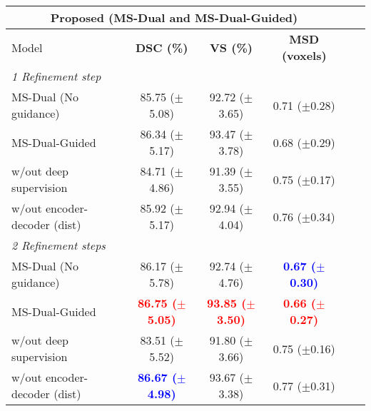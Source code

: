 \documentclass[journal]{IEEEtran}
\begin{document}
\begin{table}[ht!]
\centering
\scriptsize
\begin{tabular}{lcccc|c}\\
\toprule
\multicolumn{4}{c}{Proposed (MS-Dual and MS-Dual-Guided)} \\
\midrule
Model & \textbf{DSC (\%)} & \textbf{VS (\%)} & \textbf{MSD (voxels)}  \\
\midrule
\multicolumn{4}{l}{\textit{1 Refinement step}} \\
MS-Dual (No guidance)  & 85.75 ($\pm$5.08)& 92.72 ($\pm$3.65) & 0.71 ($\pm$0.28)\\
MS-Dual-Guided   & 86.34 ($\pm$5.17) & 93.47 ($\pm$3.78) & 0.68 ($\pm$0.29) \\
w/out deep supervision    & 84.71 ($\pm$4.86)  & 91.39 ($\pm$3.55) & 0.75 ($\pm$0.17) \\
w/out encoder-decoder (dist) &  85.92 ($\pm$5.17)  & 92.94 ($\pm$4.04) & 0.76 ($\pm$0.34)\\

\midrule
\multicolumn{4}{l}{\textit{2 Refinement steps}} \\
MS-Dual (No guidance)   & 86.17 ($\pm$5.78) & 92.74 ($\pm$4.76) &  \textcolor{blue}{\textbf{0.67 ($\pm$0.30)}}\\
MS-Dual-Guided   &  \textcolor{red}{\textbf{86.75 ($\pm$5.05)}} & \textcolor{red}{\textbf{93.85 ($\pm$3.50)}} &  \textcolor{red}{\textbf{0.66 ($\pm$0.27)}}\\
w/out deep supervision   & 83.51 ($\pm$5.52) &  91.80 ($\pm$3.66)& 0.75 ($\pm$0.16)\\
w/out encoder-decoder (dist)   &  \textcolor{blue}{\textbf{86.67 ($\pm$4.98)}}  & 93.67 ($\pm$3.38) & 0.77 ($\pm$0.31) \\


\end{tabular}
\end{table}
\end{document}
